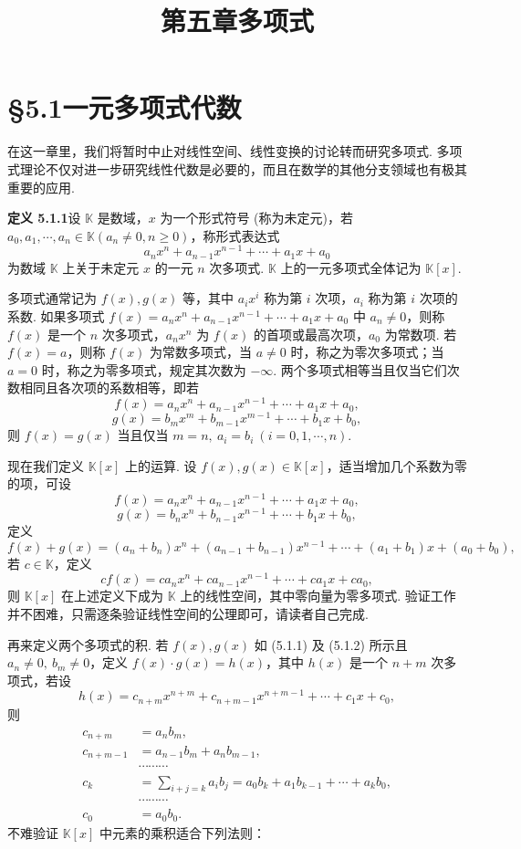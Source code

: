 \documentclass[UTF8, 12pt, fontset=fandol, oneside]{ctexart}
\title{第五章\quad 多项式}
\author{}
\date{}
\begin{document}
\maketitle

\section*{§5.1\quad 一元多项式代数}

在这一章里，我们将暂时中止对线性空间、线性变换的讨论转而研究多项式. 多项式理论不仅对进一步研究线性代数是必要的，而且在数学的其他分支领域也有极其重要的应用.

\noindent\textbf{定义 5.1.1}\quad 设 $\mathbb{K}$ 是数域，$x$ 为一个形式符号 (称为未定元)，若 $a_0,a_1,\cdots,a_n\in\mathbb{K}(a_n\neq 0,n\geq 0)$，称形式表达式
\[
a_nx^n+a_{n-1}x^{n-1}+\cdots+a_1x+a_0
\]
为数域 $\mathbb{K}$ 上关于未定元 $x$ 的一元 $n$ 次多项式. $\mathbb{K}$ 上的一元多项式全体记为 $\mathbb{K}[x]$.

多项式通常记为 $f(x),g(x)$ 等，其中 $a_ix^i$ 称为第 $i$ 次项，$a_i$ 称为第 $i$ 次项的系数. 如果多项式 $f(x)=a_nx^n+a_{n-1}x^{n-1}+\cdots+a_1x+a_0$ 中 $a_n\neq 0$，则称 $f(x)$ 是一个 $n$ 次多项式，$a_nx^n$ 为 $f(x)$ 的首项或最高次项，$a_0$ 为常数项. 若 $f(x)=a$，则称 $f(x)$ 为常数多项式，当 $a\neq 0$ 时，称之为零次多项式；当 $a=0$ 时，称之为零多项式，规定其次数为 $-\infty$. 两个多项式相等当且仅当它们次数相同且各次项的系数相等，即若
\begin{equation}
f(x)=a_nx^n+a_{n-1}x^{n-1}+\cdots+a_1x+a_0,
\tag{5.1.1}
\end{equation}
\begin{equation}
g(x)=b_mx^m+b_{m-1}x^{m-1}+\cdots+b_1x+b_0,
\tag{5.1.2}
\end{equation}
则 $f(x)=g(x)$ 当且仅当 $m=n,\ a_i=b_i\ (i=0,1,\cdots,n)$.

现在我们定义 $\mathbb{K}[x]$ 上的运算. 设 $f(x),g(x)\in\mathbb{K}[x]$，适当增加几个系数为零的项，可设
\[
f(x)=a_nx^n+a_{n-1}x^{n-1}+\cdots+a_1x+a_0,
\]
\[
g(x)=b_nx^n+b_{n-1}x^{n-1}+\cdots+b_1x+b_0,
\]
定义
\[
f(x)+g(x)=(a_n+b_n)x^n+(a_{n-1}+b_{n-1})x^{n-1}+\cdots+(a_1+b_1)x+(a_0+b_0),
\]
若 $c\in\mathbb{K}$，定义
\[
cf(x)=ca_nx^n+ca_{n-1}x^{n-1}+\cdots+ca_1x+ca_0,
\]
则 $\mathbb{K}[x]$ 在上述定义下成为 $\mathbb{K}$ 上的线性空间，其中零向量为零多项式. 验证工作并不困难，只需逐条验证线性空间的公理即可，请读者自己完成.

再来定义两个多项式的积. 若 $f(x),g(x)$ 如 (5.1.1) 及 (5.1.2) 所示且 $a_n\neq 0,\ b_m\neq 0$，定义 $f(x)\cdot g(x)=h(x)$，其中 $h(x)$ 是一个 $n+m$ 次多项式，若设
\[
h(x)=c_{n+m}x^{n+m}+c_{n+m-1}x^{n+m-1}+\cdots+c_1x+c_0,
\]
则
\[
\begin{aligned}
c_{n+m}&=a_nb_m,\\
c_{n+m-1}&=a_{n-1}b_m+a_nb_{m-1},\\
&\cdots\cdots\cdots\\
c_k&=\sum_{i+j=k}a_ib_j=a_0b_k+a_1b_{k-1}+\cdots+a_kb_0,\\
&\cdots\cdots\cdots\\
c_0&=a_0b_0.
\end{aligned}
\]
不难验证 $\mathbb{K}[x]$ 中元素的乘积适合下列法则：
\end{document}
